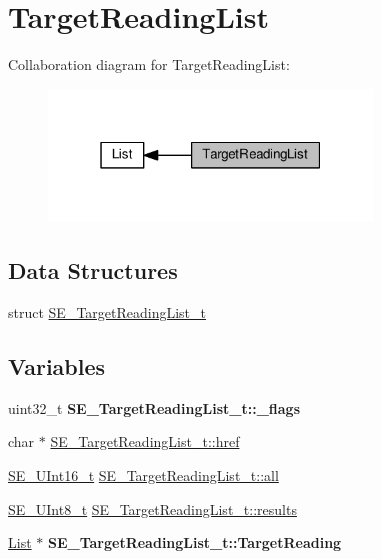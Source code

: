 \hypertarget{group__TargetReadingList}{}\section{Target\+Reading\+List}
\label{group__TargetReadingList}
Collaboration diagram for Target\+Reading\+List\+:\nopagebreak
\begin{figure}[H]
\begin{center}
\leavevmode
\includegraphics[width=244pt]{group__TargetReadingList}
\end{center}
\end{figure}
\subsection*{Data Structures}
\begin{DoxyCompactItemize}
\item 
struct \hyperlink{structSE__TargetReadingList__t}{S\+E\+\_\+\+Target\+Reading\+List\+\_\+t}
\end{DoxyCompactItemize}
\subsection*{Variables}
\begin{DoxyCompactItemize}
\item 
\mbox{\label{group__TargetReadingList_ga61bc571cb75a54005eb6c9685cea62fe}} 
uint32\+\_\+t {\bfseries S\+E\+\_\+\+Target\+Reading\+List\+\_\+t\+::\+\_\+flags}
\item 
char $\ast$ \hyperlink{group__TargetReadingList_gaa952c6e2d7dea9ac53ab0c40f4658651}{S\+E\+\_\+\+Target\+Reading\+List\+\_\+t\+::href}
\item 
\hyperlink{group__UInt16_gac68d541f189538bfd30cfaa712d20d29}{S\+E\+\_\+\+U\+Int16\+\_\+t} \hyperlink{group__TargetReadingList_gab5798a709fac8c041d53520c7335bdb2}{S\+E\+\_\+\+Target\+Reading\+List\+\_\+t\+::all}
\item 
\hyperlink{group__UInt8_gaf7c365a1acfe204e3a67c16ed44572f5}{S\+E\+\_\+\+U\+Int8\+\_\+t} \hyperlink{group__TargetReadingList_gae22837c348139e7dceb87e3a95152588}{S\+E\+\_\+\+Target\+Reading\+List\+\_\+t\+::results}
\item 
\mbox{\label{group__TargetReadingList_gac6016ce6eaff1879a182c9025f07590f}} 
\hyperlink{structList}{List} $\ast$ {\bfseries S\+E\+\_\+\+Target\+Reading\+List\+\_\+t\+::\+Target\+Reading}
\end{DoxyCompactItemize}


